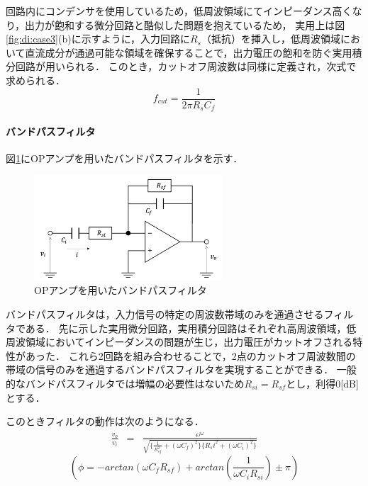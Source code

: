 \documentclass[dvipdfmx,titlepage,a4j]{jsarticle}  %
\begin{document}
回路内にコンデンサを使用しているため，低周波領域にてインピーダンス高くなり，出力が飽和する微分回路と酷似した問題を抱えているため，
実用上は図\ref{fig:di:case3}(b)に示すように，入力回路に$R_s$（抵抗）を挿入し，低周波領域において直流成分が通過可能な領域を確保することで，出力電圧の飽和を防ぐ実用積分回路が用いられる．
このとき，カットオフ周波数は同様に定義され，次式で求められる．
\begin{equation}
  f_{cut} = \frac{1}{2\pi R_s C_f}
\end{equation}

\paragraph{バンドパスフィルタ\\}
図\ref{fig:di:case4}にOPアンプを用いたバンドパスフィルタを示す．
\begin{figure}[H]
  \begin{center}
      \includegraphics[width=7cm]{../image/di-case4.png}
      \caption{OPアンプを用いたバンドパスフィルタ}
      \label{fig:di:case4}
  \end{center} 
\end{figure}

バンドパスフィルタは，入力信号の特定の周波数帯域のみを通過させるフィルタである．
先に示した実用微分回路，実用積分回路はそれぞれ高周波領域，低周波領域においてインピーダンスの問題が生じ，出力電圧がカットオフされる特性があった．
これら2回路を組み合わせることで，2点のカットオフ周波数間の帯域の信号のみを通過するバンドパスフィルタを実現することができる．
一般的なバンドパスフィルタでは増幅の必要性はないため$R_{si} = R_{sf}$とし，利得0[dB]とする．

このときフィルタの動作は次のようになる．
\begin{eqnarray}
  \frac{v_o}{v_i} &=& \frac{\epsilon^{j\omega}}{\sqrt{ \{\frac{1}{R_{sf}^2}+(\omega C_f)^2\} \{R_si^2+(\omega C_i)^2\} } }
\end{eqnarray}
\begin{equation}
  \left( \phi = -arctan(\omega C_f R_{sf}) + arctan(\frac{1}{\omega C_i R_{si}}) \pm \pi \right) 
\end{equation}
\end{document}
